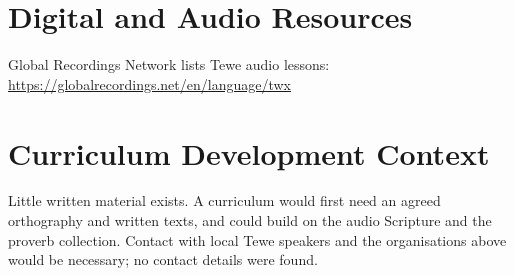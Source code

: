 \documentclass[12pt]{article}
\begin{document}
\section{Digital and Audio Resources}
Global Recordings Network lists Tewe audio lessons: \url{https://globalrecordings.net/en/language/twx}

\section{Curriculum Development Context}
Little written material exists. A curriculum would first need an agreed orthography and written texts, and could build on the audio Scripture and the proverb collection. Contact with local Tewe speakers and the organisations above would be necessary; no contact details were found.
\end{document}
